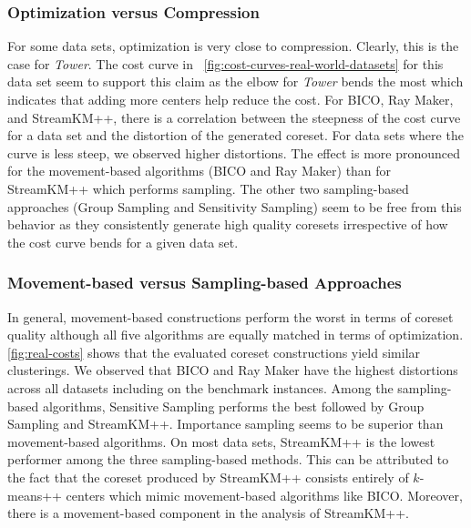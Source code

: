 \subsubsection*{Optimization versus Compression}
For some data sets, optimization is very close to compression. 
Clearly, this is the case for \textit{Tower}. The cost curve in ~\cref{fig:cost-curves-real-world-datasets} for this data set seem to support this claim as the elbow for \textit{Tower} bends the most which indicates that adding more centers help reduce the cost. For BICO, Ray Maker, and StreamKM++, there is a correlation between the steepness of the cost curve for a data set and the distortion of the generated coreset. For data sets where the curve is less steep, we observed higher distortions. The effect is more pronounced for the movement-based algorithms (BICO and Ray Maker) than for StreamKM++ which performs sampling. The other two sampling-based approaches (Group Sampling and Sensitivity Sampling) seem to be free from this behavior as they consistently generate high quality coresets irrespective of how the cost curve bends for a given data set.

\subsubsection*{Movement-based versus Sampling-based Approaches}
In general, movement-based constructions perform the worst in terms of coreset quality although all five algorithms are equally matched in terms of optimization. \cref{fig:real-costs} shows that the evaluated coreset constructions yield similar clusterings.
We observed that BICO and Ray Maker have the highest distortions across all datasets including on the benchmark instances. Among the sampling-based algorithms, Sensitive Sampling performs the best followed by Group Sampling and StreamKM++. Importance sampling seems to be superior than movement-based algorithms. On most data sets, StreamKM++ is the lowest performer among the three sampling-based methods. This can be attributed to the fact that the coreset produced by StreamKM++ consists entirely of $k$-means++ centers which mimic movement-based algorithms like BICO. Moreover, there is a movement-based component in the analysis of StreamKM++.






